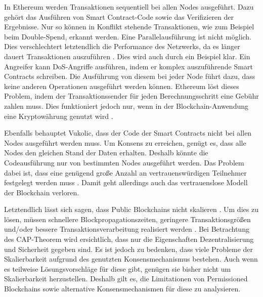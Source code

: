 In Ethereum werden Transaktionen sequentiell bei allen Nodes ausgeführt. Dazu gehört das Ausführen von Smart Contract-Code sowie das Verifizieren der Ergebnisse. Nur so können in Konflikt stehende Transaktionen, wie zum Beispiel beim Double-Spend, erkannt werden. Eine Parallelausführung ist nicht möglich. Dies verschlechtert letztendlich die Performance des Netzwerks, da es länger dauert Transaktionen auszuführen \cite{SchererPerformanceScalabilityBlockchain2017}. Dies wird auch durch ein Beispiel klar. Ein Angreifer kann DoS-Angriffe ausführen, indem er komplex auszuführende Smart Contracts schreiben. Die Ausführung von diesem bei jeder Node führt dazu, dass keine anderen Operationen ausgeführt werden können. Ethereum löst dieses Problem, indem der Transaktionssender für jeden Berechnungsschritt eine Gebühr zahlen muss. Dies funktioniert jedoch nur, wenn in der Blockchain-Anwendung eine Kryptowährung genutzt wird \cite{VukolicRethinkingPermissionedBlockchains2017}. 

Ebenfalls behauptet Vukolic, dass der Code der Smart Contracts nicht bei allen Nodes ausgeführt werden muss. Um Konsens zu erreichen, genügt es, dass alle Nodes den gleichen Stand der Daten erhalten. Deshalb könnte die Codeausführung nur von bestimmten Nodes ausgeführt werden. Das Problem dabei ist, dass eine genügend große Anzahl an vertrauenswürdigen Teilnehmer festgelegt werden muss \cite{VukolicRethinkingPermissionedBlockchains2017}. Damit geht allerdings auch das vertrauenslose Modell der Blockchain verloren.

Letztendlich lässt sich sagen, dass Public Blockchains nicht skalieren . Um dies zu lösen, müssen  schnellere Blockpropagationszeiten, geringere Transaktionsgrößen und/oder bessere Transaktionsverarbeitung realisiert werden \cite{SchererPerformanceScalabilityBlockchain2017}. Bei Betrachtung des CAP-Theorem wird ersichtlich, dass nur die Eigenschaften Dezentralisierung und Sicherheit gegeben sind. Es ist jedoch zu bedenken, dass viele Probleme der Skalierbarkeit aufgrund des genutzten Konsensmechanismus bestehen. Auch wenn es teilweise Lösungsvorschläge für diese gibt, genügen sie bisher nicht um Skalierbarkeit herzustellen. Deshalb gilt es, die Limitationen von Permissioned Blockchains sowie alternative Konsensmechanismen für diese zu analysieren.


